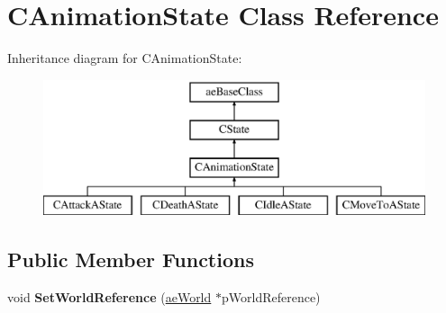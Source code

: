 \hypertarget{class_c_animation_state}{}\section{C\+Animation\+State Class Reference}
\label{class_c_animation_state}
Inheritance diagram for C\+Animation\+State\+:\begin{figure}[H]
\begin{center}
\leavevmode
\includegraphics[height=4.000000cm]{class_c_animation_state}
\end{center}
\end{figure}
\subsection*{Public Member Functions}
\begin{DoxyCompactItemize}
\item 
void {\bfseries Set\+World\+Reference} (\hyperlink{classae_world}{ae\+World} $\ast$p\+World\+Reference)\hypertarget{class_c_animation_state_a09ff62a475a6bcca566a81d4026e4940}{}\label{class_c_animation_state_a09ff62a475a6bcca566a81d4026e4940}

\end{DoxyCompactItemize}

